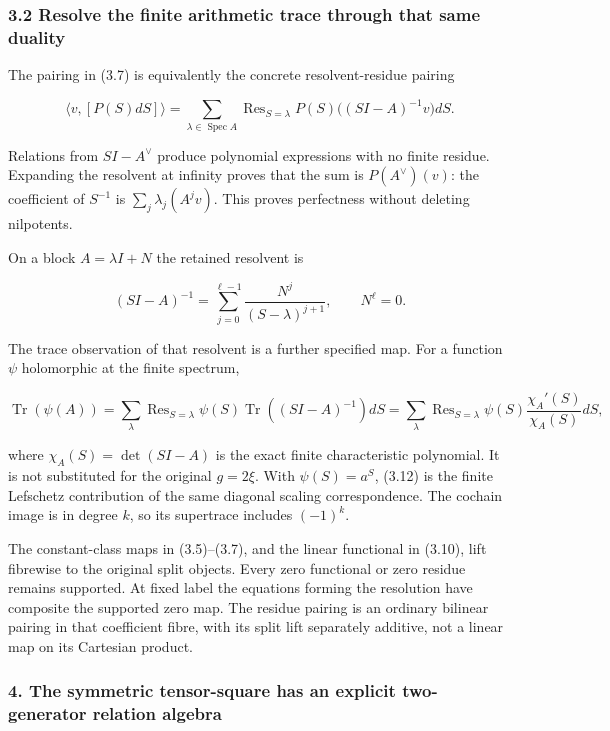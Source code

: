 \subsubsection{3.2 Resolve the finite arithmetic trace through that same
duality}\label{spectral_sum_full:resolve-the-finite-arithmetic-trace-through-that-same-duality}

The pairing in (3.7) is equivalently the concrete resolvent-residue
pairing

\[\boxed{\langle v,[P(S)dS]\rangle
=\sum_{\lambda\in\operatorname{Spec}A}
\operatorname{Res}_{S=\lambda}
P(S)\bigl((SI-A)^{-1}v\bigr)dS.}\tag{3.10}\]

Relations from \(SI-A^\vee\) produce polynomial expressions with no
finite residue. Expanding the resolvent at infinity proves that the sum
is \(P(A^\vee)(v)\): the coefficient of \(S^{-1}\) is
\(\sum_j\lambda_j(A^jv)\). This proves perfectness without deleting
nilpotents.

On a block \(A=\lambda I+N\) the retained resolvent is

\[(SI-A)^{-1}=\sum_{j=0}^{\ell-1}\frac{N^j}{(S-\lambda)^{j+1}},\qquad N^\ell=0.\tag{3.11}\]

The trace observation of that resolvent is a further specified map. For
a function \(\psi\) holomorphic at the finite spectrum,

\[\boxed{\operatorname{Tr}(\psi(A))=
\sum_\lambda\operatorname{Res}_{S=\lambda}
\psi(S)\operatorname{Tr}((SI-A)^{-1})dS
=\sum_\lambda\operatorname{Res}_{S=\lambda}\psi(S)\frac{\chi_A'(S)}{\chi_A(S)}dS,}\tag{3.12}\]

where \(\chi_A(S)=\det(SI-A)\) is the exact finite characteristic
polynomial. It is not substituted for the original \(g=2\xi\). With
\(\psi(S)=a^S\), (3.12) is the finite Lefschetz contribution of the same
diagonal scaling correspondence. The cochain image is in degree \(k\),
so its supertrace includes \((-1)^k\).

The constant-class maps in (3.5)--(3.7), and the linear functional in
(3.10), lift fibrewise to the original split objects. Every zero
functional or zero residue remains supported. At fixed label the
equations forming the resolution have composite the supported zero map.
The residue pairing is an ordinary bilinear pairing in that coefficient
fibre, with its split lift separately additive, not a linear map on its
Cartesian product.

\subsubsection{4. The symmetric tensor-square has an explicit two-generator
relation
algebra}\label{spectral_sum_full:the-symmetric-tensor-square-has-an-explicit-two-generator-relation-algebra}

